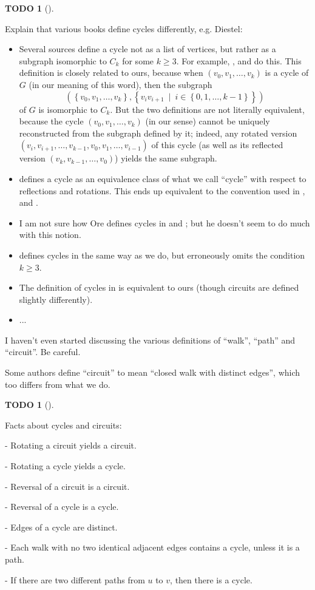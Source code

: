 \documentclass[numbers=enddot,12pt,final,onecolumn,notitlepage]{scrartcl}%
\theoremstyle{definition}
\newtheorem{quest}[theo]{TODO}
\newenvironment{todo}[1][]
{\begin{quest}[#1]\begin{leftbar}}
{\end{leftbar}\end{quest}}
\newcommand{\set}[1]{\left\{ #1 \right\}}
\newcommand{\tup}[1]{\left( #1 \right)}
\begin{document}
\begin{todo}
Explain that various books define cycles differently, e.g. Diestel:
\begin{itemize}
\item Several sources define a cycle not as a list of vertices,
      but rather as a subgraph isomorphic to $C_k$ for some
      $k \geq 3$. For example, \cite{Dieste16}, \cite{BonMur08} and
      \cite{West01} do this. This definition is closely related to
      ours, because when $\tup{v_0, v_1, \ldots, v_k}$ is a cycle of
      $G$ (in our meaning of this word), then the subgraph
      \[
      \tup{ \set{v_0, v_1, \ldots, v_k} ,
            \set{v_i v_{i+1} \ \mid \  i \in \set{0, 1, \ldots, k-1}}
          }
      \]
      of $G$ is isomorphic to $C_k$. But the two definitions are not
      literally equivalent, because the cycle
      $\tup{v_0, v_1, \ldots, v_k}$ (in our sense) cannot be uniquely
      reconstructed from the subgraph defined by it; indeed, any
      rotated version $\tup{v_i, v_{i+1}, \ldots, v_{k-1}, v_0, v_1,
      \ldots, v_{i-1}}$ of this cycle (as well as its reflected
      version $\tup{v_k, v_{k-1}, \ldots, v_0}$) yields the same
      subgraph.
\item \cite{Bollob98} defines a cycle as an equivalence class of what
      we call ``cycle'' with respect to reflections and rotations.
      This ends up equivalent to the convention used in
      \cite{Dieste16}, \cite{BonMur08} and \cite{West01}.
\item I am not sure how Ore defines cycles in \cite{Ore90} and
      \cite{Ore74}; but he doesn't seem to do much with this notion.
\item \cite{Harju14} defines cycles in the same way as we do, but
      erroneously omits the condition $k \geq 3$.
\item The definition of cycles in \cite{BehCha71} is equivalent to
      ours (though circuits are defined slightly differently).
\item ...
\end{itemize}
I haven't even started discussing the various definitions of ``walk'',
``path'' and ``circuit''. Be careful.

Some authors define ``circuit'' to mean ``closed walk with distinct
edges'', which too differs from what we do.
\end{todo}


\begin{todo}
Facts about cycles and circuits:

- Rotating a circuit yields a circuit.

- Rotating a cycle yields a cycle.

- Reversal of a circuit is a circuit.

- Reversal of a cycle is a cycle.

- Edges of a cycle are distinct.

- Each walk with no two identical adjacent edges contains a cycle,
  unless it is a path.

- If there are two different paths from $u$ to $v$, then there is a
  cycle.
\end{todo}
\end{document}
